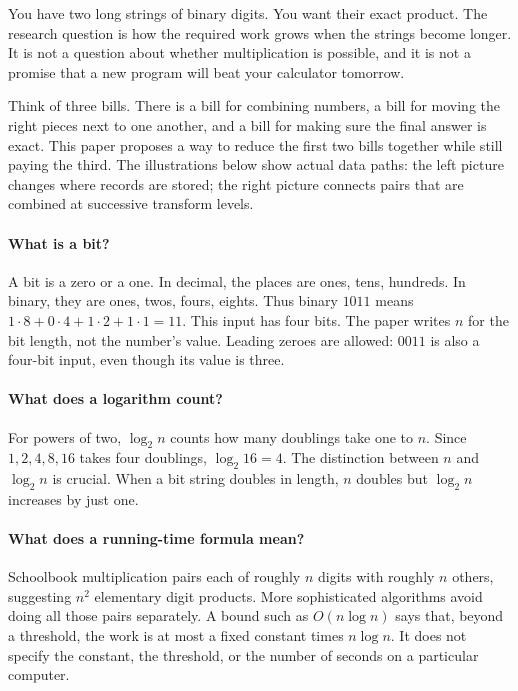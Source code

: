 
You have two long strings of binary digits. You want their exact product.
The research question is how the required work grows when the strings become
longer. It is not a question about whether multiplication is possible, and it
is not a promise that a new program will beat your calculator tomorrow.

Think of three bills. There is a bill for combining numbers, a bill for moving
the right pieces next to one another, and a bill for making sure the final
answer is exact. This paper proposes a way to reduce the first two bills
together while still paying the third. The illustrations below show actual
data paths: the left picture changes where records are stored; the right
picture connects pairs that are combined at successive transform levels.


\paragraph{What is a bit?}
A bit is a zero or a one. In decimal, the places are ones, tens, hundreds.
In binary, they are ones, twos, fours, eights. Thus binary $1011$ means
$1\cdot8+0\cdot4+1\cdot2+1\cdot1=11$. This input has four bits.
The paper writes $n$ for the bit length, not the number's value. Leading
zeroes are allowed: $0011$ is also a four-bit input, even though its value is three.

\paragraph{What does a logarithm count?}
For powers of two, $\log_2 n$ counts how many doublings take one to $n$.
Since $1,2,4,8,16$ takes four doublings, $\log_2 16=4$.
The distinction between $n$ and $\log_2 n$ is crucial. When a bit string
doubles in length, $n$ doubles but $\log_2 n$ increases by just one.

\paragraph{What does a running-time formula mean?}
Schoolbook multiplication pairs each of roughly $n$ digits with roughly
$n$ others, suggesting $n^2$ elementary digit products. More sophisticated
algorithms avoid doing all those pairs separately. A bound such as
$O(n\log n)$ says that, beyond a threshold, the work is at most a fixed
constant times $n\log n$. It does not specify the constant, the threshold,
or the number of seconds on a particular computer.


